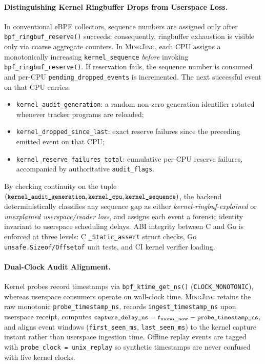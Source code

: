 \documentclass[10pt,twocolumn,letterpaper]{article}
\newcommand{\sys}{\textsc{MingJing}}
\newcommand{\code}[1]{\texttt{\small #1}}
\begin{document}
\paragraph{Distinguishing Kernel Ringbuffer Drops from Userspace Loss.} In conventional eBPF collectors, sequence numbers are assigned only after \code{bpf\_ringbuf\_reserve()} succeeds; consequently, ringbuffer exhaustion is visible only via coarse aggregate counters. In \sys{}, each CPU assigns a monotonically increasing \code{kernel\_sequence} \emph{before} invoking \code{bpf\_ringbuf\_reserve()}. If reservation fails, the sequence number is consumed and per-CPU \code{pending\_dropped\_events} is incremented. The next successful event on that CPU carries:
\begin{itemize}
  \item \code{kernel\_audit\_generation}: a random non-zero generation identifier rotated whenever tracker programs are reloaded;
  \item \code{kernel\_dropped\_since\_last}: exact reserve failures since the preceding emitted event on that CPU;
  \item \code{kernel\_reserve\_failures\_total}: cumulative per-CPU reserve failures, accompanied by authoritative \code{audit\_flags}.
\end{itemize}
By checking continuity on the tuple $(\code{kernel\_audit\_generation}, \code{kernel\_cpu}, \code{kernel\_sequence})$, the backend deterministically classifies any sequence gap as either \emph{kernel-ringbuf-explained} or \emph{unexplained userspace/reader loss}, and assigns each event a forensic identity invariant to userspace scheduling delays. ABI integrity between C and Go is enforced at three levels: C \code{\_Static\_assert} struct checks, Go \code{unsafe.Sizeof/Offsetof} unit tests, and CI kernel verifier loading.

\paragraph{Dual-Clock Audit Alignment.} Kernel probes record timestamps via \code{bpf\_ktime\_get\_ns()} (\code{CLOCK\_MONOTONIC}), whereas userspace consumers operate on wall-clock time. \sys{} retains the raw monotonic \code{probe\_timestamp\_ns}, records \code{ingest\_timestamp\_ns} upon userspace receipt, computes $\code{capture\_delay\_ns} = t_{\text{mono\_now}} - \code{probe\_timestamp\_ns}$, and aligns event windows (\code{first\_seen\_ms}, \code{last\_seen\_ms}) to the kernel capture instant rather than userspace ingestion time. Offline replay events are tagged with \code{probe\_clock = unix\_replay} so synthetic timestamps are never confused with live kernel clocks.
\end{document}
